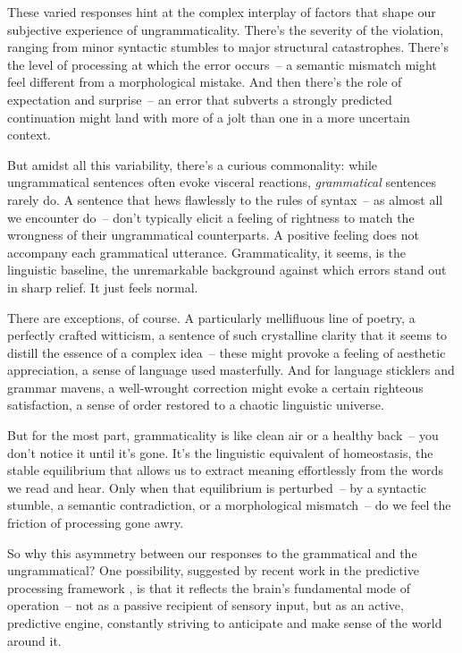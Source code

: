 \ea\label{ex:green-cheese}
    \z
\z

These varied responses hint at the complex interplay of factors that shape our subjective experience of ungrammaticality. There's the severity of the violation, ranging from minor syntactic stumbles to major structural catastrophes. There's the level of processing at which the error occurs~-- a semantic mismatch might feel different from a morphological mistake. And then there's the role of expectation and surprise~-- an error that subverts a strongly predicted continuation might land with more of a jolt than one in a more uncertain context.

But amidst all this variability, there's a curious commonality: while ungrammatical sentences often evoke visceral reactions, \textit{grammatical} sentences rarely do. A sentence that hews flawlessly to the rules of syntax~-- as almost all we encounter do~-- don't typically elicit a feeling of rightness to match the wrongness of their ungrammatical counterparts. A positive feeling does not accompany each grammatical utterance. Grammaticality, it seems, is the linguistic baseline, the unremarkable background against which errors stand out in sharp relief. It just feels normal.

There are exceptions, of course. A particularly mellifluous line of poetry, a perfectly crafted witticism, a sentence of such crystalline clarity that it seems to distill the essence of a complex idea~-- these might provoke a feeling of aesthetic appreciation, a sense of language used masterfully. And for language sticklers and grammar mavens, a well-wrought correction might evoke a certain righteous satisfaction, a sense of order restored to a chaotic linguistic universe.

But for the most part, grammaticality is like clean air or a healthy back~-- you don't notice it until it's gone. It's the linguistic equivalent of homeostasis, the stable equilibrium that allows us to extract meaning effortlessly from the words we read and hear. Only when that equilibrium is perturbed~-- by a syntactic stumble, a semantic contradiction, or a morphological mismatch~-- do we feel the friction of processing gone awry.

So why this asymmetry between our responses to the grammatical and the ungrammatical? One possibility, suggested by recent work in the predictive processing framework \citep{Clark2013,Friston2010}, is that it reflects the brain's fundamental mode of operation~-- not as a passive recipient of sensory input, but as an active, predictive engine, constantly striving to anticipate and make sense of the world around it.

